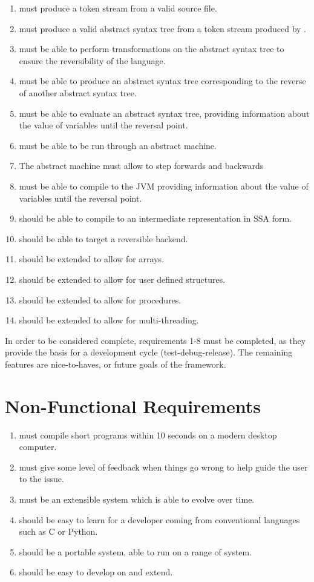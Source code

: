 \begin{enumerate}
    \item \rimp must produce a token stream from a valid \rimplang source file.
    \item \rimp must produce a valid abstract syntax tree from a token stream produced by \rimp.
    \item \rimp must be able to perform transformations on the abstract syntax tree to ensure the reversibility of the language.
    \item \rimp must be able to produce an abstract syntax tree corresponding to the reverse of another abstract syntax tree.
    \item \rimp must be able to evaluate an abstract syntax tree, providing information about the value of variables until the reversal point.
    \item \rimp must be able to be run through an abstract machine.
    \item The \rimp abstract machine must allow to step forwards and backwards
    \item \rimp must be able to compile to the JVM providing information about the value of variables until the reversal point.
    \item \rimp should be able to compile to an intermediate representation in SSA form.
    \item \rimp should be able to target a reversible backend.
    \item \rimp should be extended to allow for arrays.
    \item \rimp should be extended to allow for user defined structures.
    \item \rimp should be extended to allow for procedures.
    \item \rimp should be extended to allow for multi-threading.
\end{enumerate}

In order to be considered complete, requirements 1-8 must be completed, as they provide the basis for a development cycle (test-debug-release). The remaining features are nice-to-haves, or future goals of the \rimp framework.

\section{Non-Functional Requirements}

\begin{enumerate}
    \item \rimp must compile short programs within 10 seconds on a modern desktop computer.
    \item \rimp must give some level of feedback when things go wrong to help guide the user to the issue.
    \item \rimp must be an extensible system which is able to evolve over time.
    \item \rimp should be easy to learn for a developer coming from conventional languages such as C or Python.
    \item \rimp should be a portable system, able to run on a range of system.
    \item \rimp should be easy to develop on and extend.
\end{enumerate}

